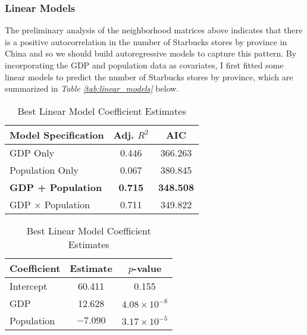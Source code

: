 \documentclass{article}
\begin{document}
\subsubsection{Linear Models}

The preliminary analysis of the neighborhood matrices above indicates that there is a positive autocorrelation in the number of Starbucks stores by province in China and so we should build autoregressive models to capture this pattern. By incorporating the GDP and population data as covariates, I first fitted some linear models to predict the number of Starbucks stores by province, which are summarized in \textit{Table \ref{tab:linear_models}} below.

\begin{table}[htbp]
    \centering
    \begin{minipage}{0.48\linewidth}
        \centering
        \begin{tabular}{l c c}
            \toprule
            \textbf{Model Specification} & \textbf{Adj. \(R^2\)} & \textbf{AIC} \\
            \midrule
            GDP Only & 0.446 & 366.263 \\
            Population Only & 0.067 & 380.845 \\
            \textbf{GDP + Population} & \textbf{0.715} & \textbf{348.508} \\
            GDP \(\times\) Population & 0.711 & 349.822 \\
            \bottomrule
        \end{tabular}
        \caption{Fitted Linear Models}
        \label{tab:linear_models}
    \end{minipage}
    \quad
    \begin{minipage}{0.48\linewidth}
        \centering
        \begin{tabular}{l c c}
            \toprule
            \textbf{Coefficient} & \textbf{Estimate} & \textbf{\(p\)-value} \\
            \midrule
            Intercept & 60.411 & 0.155 \\
            GDP & 12.628 & \(4.08 \times 10 ^ {-8}\) \\
            Population & \(-7.090\) & \(3.17 \times 10 ^ {-5}\) \\
            \bottomrule
        \end{tabular}
        \caption{Best Linear Model Coefficient Estimates}
        \label{tab:best_linear}
    \end{minipage}
\end{table}
\end{document}
